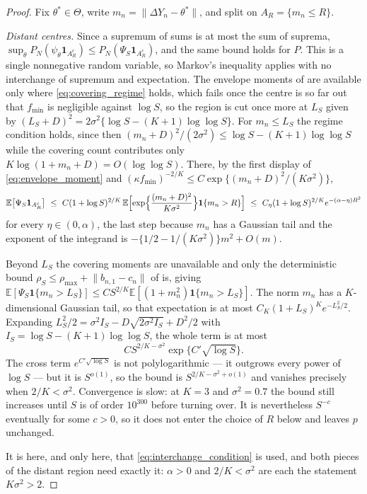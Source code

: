\documentclass[11pt]{article}
\theoremstyle{definition}
\newcommand{\E}{\mathbb{E}}
\begin{document}
\begin{proof}
Fix $\theta^*\in\Theta$, write $m_n=\lVert\Delta Y_n-\theta^*\rVert$, and split on $A_R=\{m_n\le R\}$.

\emph{Distant centres.} Since a supremum of sums is at most the sum of suprema, $\sup_\theta P_N(\psi_\theta\mathbf{1}_{A_R^c})\le P_N(\Psi_S\mathbf{1}_{A_R^c})$, and the same bound holds for $P$. This is a single nonnegative random variable, so Markov's inequality applies with no interchange of supremum and expectation. The envelope moments of  are available only where \eqref{eq:covering_regime} holds, which fails once the centre is so far out that $f_{\min}$ is negligible against $\log S$, so the region is cut once more at $L_S$ given by $(L_S+D)^2=2\sigma^2\{\log S-(K+1)\log\log S\}$. For $m_n\le L_S$ the regime condition holds, since then $(m_n+D)^2/(2\sigma^2)\le\log S-(K+1)\log\log S$ while the covering count contributes only $K\log(1+m_n+D)=O(\log\log S)$. There, by the first display of \eqref{eq:envelope_moment} and $(\kappa f_{\min})^{-2/K}\le C\exp\{(m_n+D)^2/(K\sigma^2)\}$,
\[
\E\bigl[\Psi_S\mathbf{1}_{A_R^c}\bigr]
\ \le\ C(1+\log S)^{2/K}\,
\E\Bigl[\exp\Bigl\{\frac{(m_n+D)^2}{K\sigma^2}\Bigr\}\mathbf{1}\{m_n>R\}\Bigr]
\ \le\ C_\eta(1+\log S)^{2/K}e^{-(\alpha-\eta)R^2}
\]
for every $\eta\in(0,\alpha)$, the last step because $m_n$ has a Gaussian tail and the exponent of the integrand is $-\{1/2-1/(K\sigma^2)\}m^2+O(m)$.

Beyond $L_S$ the covering moments are unavailable and only the deterministic bound $\rho_S\le\rho_{\max}+\lVert b_{n,1}-c_n\rVert$ of  is, giving $\E[\Psi_S\mathbf{1}\{m_n>L_S\}]\le CS^{2/K}\E[(1+m_n^2)\mathbf{1}\{m_n>L_S\}]$. The norm $m_n$ has a $K$-dimensional Gaussian tail, so that expectation is at most $C_K(1+L_S)^{K}e^{-L_S^2/2}$. Expanding $L_S^2/2=\sigma^2I_S-D\sqrt{2\sigma^2I_S}+D^2/2$ with $I_S=\log S-(K+1)\log\log S$, the whole term is at most
\[
CS^{2/K-\sigma^2}\exp\bigl\{C'\sqrt{\log S}\bigr\} .
\]
The cross term $e^{C'\sqrt{\log S}}$ is not polylogarithmic --- it outgrows every power of $\log S$ --- but it is $S^{o(1)}$, so the bound is $S^{2/K-\sigma^2+o(1)}$ and vanishes precisely when $2/K<\sigma^2$. Convergence is slow: at $K=3$ and $\sigma^2=0.7$ the bound still increases until $S$ is of order $10^{300}$ before turning over. It is nevertheless $S^{-c}$ eventually for some $c>0$, so it does not enter the choice of $R$ below and leaves $p$ unchanged.

It is here, and only here, that \eqref{eq:interchange_condition} is used, and both pieces of the distant region need exactly it: $\alpha>0$ and $2/K<\sigma^2$ are each the statement $K\sigma^2>2$.


\end{proof}
\end{document}
